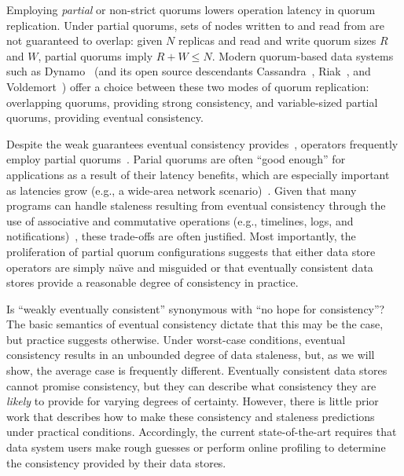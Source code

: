 \documentclass{vldb}
\begin{document}
Employing \textit{partial} or non-strict quorums lowers operation
latency in quorum replication.  Under partial quorums, sets of nodes
written to and read from are not guaranteed to overlap: given $N$
replicas and read and write quorum sizes $R$ and $W$, partial quorums
imply $R+W \leq N$.  Modern quorum-based data systems such as
Dynamo~\cite{dynamo} (and its open source descendants
Cassandra~\cite{cassandra}, Riak~\cite{riak}, and
Voldemort~\cite{voldemort}) offer a choice between these two modes of
quorum replication: overlapping quorums, providing strong consistency,
and variable-sized partial quorums, providing eventual consistency.

Despite the weak guarantees eventual consistency
provides~\cite{hamilton-cap, cops, walter}, operators frequently
employ partial quorums~\cite{cassandra, cassandra-docs,
  cassandradefault,feinbergpc,reddit, outbrain, maxperfblog}.  Parial
quorums are often ``good enough'' for applications as a result of
their latency benefits, which are especially important as latencies
grow (e.g., a wide-area network scenario)~\cite{abadilatconsist,
  feinbergpc}.  Given that many programs can handle staleness
resulting from eventual consistency through the use of associative and
commutative operations (e.g., timelines, logs, and
notifications)~\cite{calm, helland}, these trade-offs are often
justified.  Most importantly, the proliferation of partial quorum
configurations suggests that either data store operators are simply
na\"{\i}ve and misguided or that eventually consistent data stores
provide a reasonable degree of consistency in practice.

Is ``weakly eventually consistent'' synonymous with ``no hope for
consistency''? The basic semantics of eventual consistency dictate
that this may be the case, but practice suggests otherwise. Under
worst-case conditions, eventual consistency results in an unbounded
degree of data staleness, but, as we will show, the average case is
frequently different.  Eventually consistent data stores cannot
promise consistency, but they can describe what consistency they are
\textit{likely} to provide for varying degrees of certainty.  However,
there is little prior work that describes how to make these
consistency and staleness predictions under practical conditions.
Accordingly, the current state-of-the-art requires that data system
users make rough guesses or perform online profiling to determine the
consistency provided by their data stores.
\end{document}
